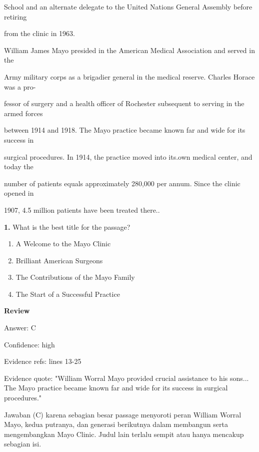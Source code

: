 \documentclass[12pt]{article}
\begin{document}
School and an alternate delegate to the United Nations General Assembly before retiring\par
from the clinic in 1963.\par
William James Mayo presided in the American Medical Association and served in the\par
Army military corps as a brigadier general in the medical reserve. Charles Horace was a pro-\par
fessor of surgery and a health officer of Rochester subsequent to serving in the armed forces\par
between 1914 and 1918. The Mayo practice became known far and wide for its success in\par
surgical procedures. In 1914, the practice moved into its.own medical center, and today the\par
number of patients equals approximately 280,000 per annum. Since the clinic opened in\par
1907, 4.5 million patients have been treated there..\par
\endgroup
\medskip
\noindent\textbf{1.} What is the best title for the passage?
\begin{enumerate}[label=(\Alph*),leftmargin=*,itemsep=0.2em]
\item A Welcome to the Mayo Clinic
\item Brilliant American Surgeons
\item The Contributions of the Mayo Family
\item The Start of a Successful Practice
\end{enumerate}
\par
\begingroup
\setlength{\parskip}{0pt}
\setlength{\parindent}{0pt}
\textbf{Review}\par
Answer: C\par
Confidence: high\par
Evidence refs: lines 13-25\par
Evidence quote: "William Worral Mayo provided crucial assistance to his sons... The Mayo practice became known far and wide for its success in surgical procedures."\par
Jawaban (C) karena sebagian besar passage menyoroti peran William Worral Mayo, kedua putranya, dan generasi berikutnya dalam membangun serta mengembangkan Mayo Clinic. Judul lain terlalu sempit atau hanya mencakup sebagian isi.\par
\endgroup
\par
\vspace{0.25\baselineskip}
\end{document}
